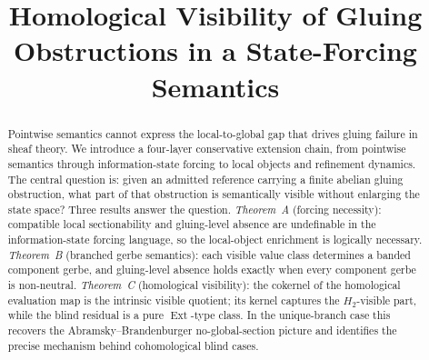 \documentclass[reqno]{amsart}
\title[Homological Visibility of Gluing Obstructions]{Homological Visibility of Gluing Obstructions in a State-Forcing Semantics}
\author{}
\theoremstyle{definition}
\theoremstyle{remark}
\begin{document}
\begin{abstract}
Pointwise semantics cannot express the local-to-global gap that drives gluing failure in sheaf theory. We introduce a four-layer conservative extension chain, from pointwise semantics through information-state forcing to local objects and refinement dynamics. The central question is: given an admitted reference carrying a finite abelian gluing obstruction, what part of that obstruction is semantically visible without enlarging the state space? Three results answer the question. \emph{Theorem~A} (forcing necessity): compatible local sectionability and gluing-level absence are undefinable in the information-state forcing language, so the local-object enrichment is logically necessary. \emph{Theorem~B} (branched gerbe semantics): each visible value class determines a banded component gerbe, and gluing-level absence holds exactly when every component gerbe is non-neutral. \emph{Theorem~C} (homological visibility): the cokernel of the homological evaluation map is the intrinsic visible quotient; its kernel captures the $H_2$-visible part, while the blind residual is a pure $\operatorname{Ext}$-type class. In the unique-branch case this recovers the Abramsky--Brandenburger no-global-section picture and identifies the precise mechanism behind cohomological blind cases.
\end{abstract}


\maketitle















\end{document}
